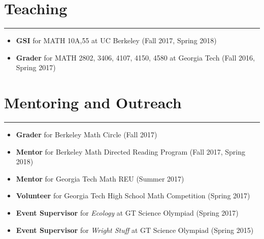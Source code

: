 \documentclass{article}
\begin{document}
\section*{Teaching}
\noindent\rule{16.5cm}{0.6pt}
\begin{itemize}[label=\raisebox{0.25ex}{\tiny$\bullet$}]
\item {\bf GSI} for MATH 10A,55 at UC Berkeley (Fall 2017, Spring 2018)
\item {\bf Grader} for MATH 2802, 3406, 4107, 4150, 4580 at Georgia Tech (Fall 2016, Spring 2017)
\end{itemize}

\section*{Mentoring and Outreach}
\noindent\rule{16.5cm}{0.6pt}
\begin{itemize}[label=\raisebox{0.25ex}{\tiny$\bullet$}]
\item {\bf Grader} for Berkeley Math Circle (Fall 2017)
\item {\bf Mentor} for Berkeley Math Directed Reading Program (Fall 2017, Spring 2018)
\item {\bf Mentor} for Georgia Tech Math REU (Summer 2017)
\item {\bf Volunteer} for Georgia Tech High School Math Competition (Spring 2017) 
\item {\bf Event Supervisor} for \emph{Ecology} at GT Science Olympiad (Spring 2017)
\item {\bf Event Supervisor} for \emph{Wright Stuff} at GT Science Olympiad (Spring 2015)
\end{itemize}

\end{document}
